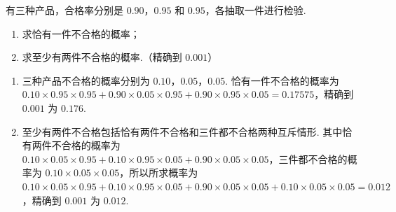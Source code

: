 \begin{problem}
有三种产品，合格率分别是 \(0.90\)，\(0.95\) 和 \(0.95\)，各抽取一件进行检验.

\begin{enumerate}
\item 求恰有一件不合格的概率；
\item 求至少有两件不合格的概率.（精确到 \(0.001\)）
\end{enumerate}

\begin{solution}
\begin{enumerate}
\item 三种产品不合格的概率分别为 \(0.10\)，\(0.05\)，\(0.05\). 恰有一件不合格的概率为 \(0.10\times0.95\times0.95+0.90\times0.05\times0.95+0.90\times0.95\times0.05=0.17575\)，精确到 \(0.001\) 为 \(0.176\).
\item 至少有两件不合格包括恰有两件不合格和三件都不合格两种互斥情形. 其中恰有两件不合格的概率为 \(0.10\times0.05\times0.95+0.10\times0.95\times0.05+0.90\times0.05\times0.05\)，三件都不合格的概率为 \(0.10\times0.05\times0.05\)，所以所求概率为 \(0.10\times0.05\times0.95+0.10\times0.95\times0.05+0.90\times0.05\times0.05+0.10\times0.05\times0.05=0.012\)，精确到 \(0.001\) 为 \(0.012\).
\end{enumerate}
\end{solution}
\end{problem}

